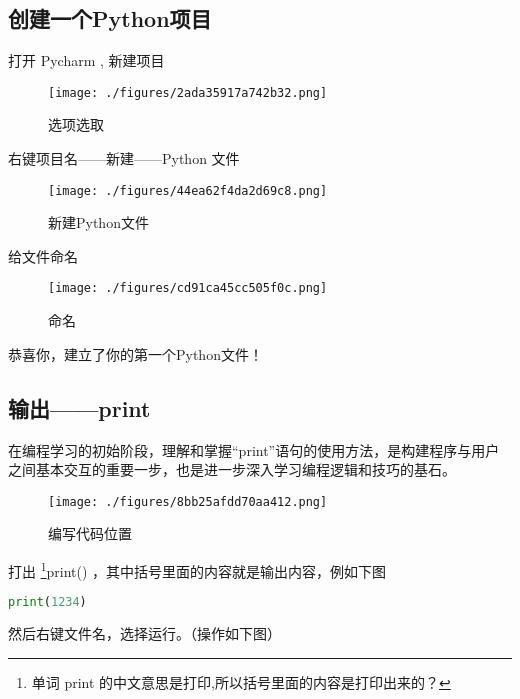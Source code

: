 

\begin{issues}
\issueTODO
\end{issues}

\subsection{创建一个Python项目}

打开 Pycharm , 新建项目

\begin{figure}[ht]
\centering
\texttt{[image: ./figures/2ada35917a742b32.png]}
\caption{选项选取} \label{fig_Pyc2_2}
\end{figure}

右键项目名——新建——Python 文件

\begin{figure}[ht]
\centering
\texttt{[image: ./figures/44ea62f4da2d69c8.png]}
\caption{新建Python文件} \label{fig_Pyc2_1}
\end{figure}

给文件命名

\begin{figure}[ht]
\centering
\texttt{[image: ./figures/cd91ca45cc505f0c.png]}
\caption{命名} \label{fig_Pyc2_3}
\end{figure}

恭喜你，建立了你的第一个Python文件！

\subsection{输出——print}

在编程学习的初始阶段，理解和掌握“print”语句的使用方法，是构建程序与用户之间基本交互的重要一步，也是进一步深入学习编程逻辑和技巧的基石。

\begin{figure}[ht]
\centering
\texttt{[image: ./figures/8bb25afdd70aa412.png]}
\caption{编写代码位置} \label{fig_Pyc2_4}
\end{figure}

打出 \footnote{单词 print 的中文意思是打印,所以括号里面的内容是打印出来的？}print() ，其中括号里面的内容就是输出内容，例如下图

\begin{lstlisting}[language=python]
print(1234)
\end{lstlisting}

然后右键文件名，选择运行。（操作如下图）

